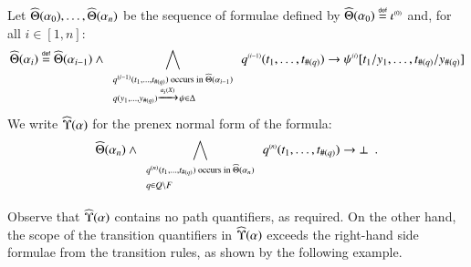 \begin{definition}\label{def:quantform}
  Let $\widehat{\Theta}({\alpha_0}), \ldots, \widehat{\Theta}({\alpha_n})$ be the
  sequence of formulae defined by $\widehat{\Theta}({\alpha_0}) \stackrel{\scriptscriptstyle{\mathsf{def}}}{=}
  {\iota}^{\scriptscriptstyle{({0})}}$ and, for all $i \in [1,n]$:
  \vspace*{-.5\baselineskip}
  \[\widehat{\Theta}({\alpha_i}) \stackrel{\scriptscriptstyle{\mathsf{def}}}{=} \widehat{\Theta}({\alpha_{i-1}}) \wedge
  \bigwedge_{\begin{array}{l}
      \scriptstyle{{q}^{\scriptscriptstyle{({i-1})}}(t_1,\ldots,t_{\#(q)}) \text{ occurs in } \widehat{\Theta}({\alpha_{i-1}})} \\
      \scriptstyle{q(y_1,\ldots,y_{\#(q)}) \xrightarrow{{\scriptscriptstyle a_i(X)}}_{{\scriptstyle }} \psi \in \Delta} 
  \end{array}} {q}^{\scriptscriptstyle{({i-1})}}(t_1,\ldots,t_{\#(q)}) \rightarrow 
    {\psi}^{\scriptscriptstyle{({i})}}[t_1/y_1, \ldots, t_{\#(q)}/y_{\#(q)}]
      \]  
      \vspace*{-.5\baselineskip}
      We write
    $\widehat{\Upsilon}({\alpha})$ for the prenex normal form of the formula: 
      \[\widehat{\Theta}({\alpha_n}) \wedge \bigwedge_{\begin{array}{l}
          \scriptstyle{{q}^{\scriptscriptstyle{({n})}}(t_1,\ldots,t_{\#(q)}) \text{ occurs in } \widehat{\Theta}({\alpha_n})} \\
          \scriptstyle{q \in Q \setminus F}
      \end{array}} {q}^{\scriptscriptstyle{({n})}}(t_1,\ldots,t_{\#(q)}) \rightarrow \bot \enspace.\]
\end{definition}
Observe that $\widehat{\Upsilon}({\alpha})$ contains no path quantifiers, as
required. On the other hand, the scope of the transition quantifiers
in $\widehat{\Upsilon}({\alpha})$ exceeds the right-hand side formulae from the
transition rules, as shown by the following example. 

